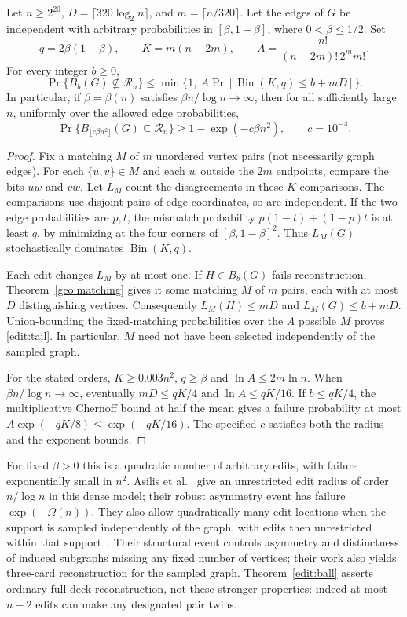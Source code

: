 \begin{theorem}\label{edit:ball}
Let $n\ge2^{20}$, $D=\lceil320\log_2 n\rceil$, and $m=\lceil n/320\rceil$.
Let the edges of $G$ be independent with arbitrary probabilities in
$[\beta,1-\beta]$, where $0<\beta\le1/2$. Set
\[
 q=2\beta(1-\beta),\qquad K=m(n-2m),\qquad
 A=\frac{n!}{(n-2m)!\,2^m m!}.
\]
For every integer $b\ge0$,
\begin{equation}\label{edit:tail}
 \Pr\{B_b(G)\not\subseteq\mathcal R_n\}
 \le \min\{1,\ A\Pr[\operatorname{Bin}(K,q)\le b+mD]\}.
\end{equation}
In particular, if $\beta=\beta(n)$ satisfies $\beta n/\log n\to\infty$,
then for all sufficiently large $n$, uniformly over the allowed edge
probabilities,
\[
 \Pr\{B_{\lfloor c\beta n^2\rfloor}(G)\subseteq\mathcal R_n\}
 \ge1-\exp(-c\beta n^2),\qquad c=10^{-4}.
\]
\end{theorem}
\begin{proof}
Fix a matching $M$ of $m$ unordered vertex pairs (not necessarily graph
edges). For each $\{u,v\}\in M$ and each $w$ outside the $2m$ endpoints,
compare the bits $uw$ and $vw$. Let $L_M$ count the disagreements in
these $K$ comparisons. The comparisons use disjoint pairs of edge
coordinates, so are independent. If the two edge probabilities are
$p,t$, the mismatch probability $p(1-t)+(1-p)t$ is at least $q$,
by minimizing at the four corners of $[\beta,1-\beta]^2$. Thus
$L_M(G)$ stochastically dominates $\operatorname{Bin}(K,q)$.

Each edit changes $L_M$ by at most one. If $H\in B_b(G)$ fails
reconstruction, Theorem~\ref{geo:matching} gives it some matching
$M$ of $m$ pairs, each with at most $D$ distinguishing vertices.
Consequently $L_M(H)\le mD$ and $L_M(G)\le b+mD$. Union-bounding
the fixed-matching probabilities over the $A$ possible $M$ proves
\eqref{edit:tail}. In particular, $M$ need not have been selected
independently of the sampled graph.

For the stated orders, $K\ge0.003n^2$, $q\ge\beta$ and
$\ln A\le2m\ln n$. When $\beta n/\log n\to\infty$, eventually
$mD\le qK/4$ and $\ln A\le qK/16$. If $b\le qK/4$, the
multiplicative Chernoff bound at half the mean gives a failure
probability at most $A\exp(-qK/8)\le\exp(-qK/16)$. The specified
$c$ satisfies both the radius and the exponent bounds.
\end{proof}

For fixed $\beta>0$ this is a quadratic number of arbitrary edits, with
failure exponentially small in $n^2$. Asilis et al.~\cite[Cor.~18--21]{acht}
give an unrestricted edit radius of order $n/\log n$ in this dense
model; their robust asymmetry event has failure $\exp(-\Omega(n))$.
They also allow quadratically many edit locations when the support is
sampled independently of the graph, with edits then unrestricted
within that support~\cite[Lem.~13, Thm.~15]{acht}. Their structural
event controls asymmetry and distinctness of induced subgraphs missing
any fixed number of vertices; their work also yields three-card
reconstruction for the sampled graph. Theorem~\ref{edit:ball} asserts
ordinary full-deck reconstruction, not these stronger properties:
indeed at most $n-2$ edits can make any designated pair twins.

